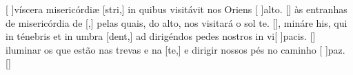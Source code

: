 {  %
  {[ ]{ví}scera misericórdiæ [stri,] in quibus visitávit nos Oriens [ ]{al}to. [\LinkLA]}%
    { às entranhas de misericórdia de [,] pelas quais, do alto, nos visitará o sol te. [\LinkPT]},
  {mináre his, qui in ténebris et in umbra [dent,] ad dirigéndos pedes nostros in vi[ ]{pa}cis. [\LinkLA]}%
    { iluminar os que estão nas trevas e na [te,] e dirigir nossos pés no caminho [ ]{paz}. [\LinkPT]}
}